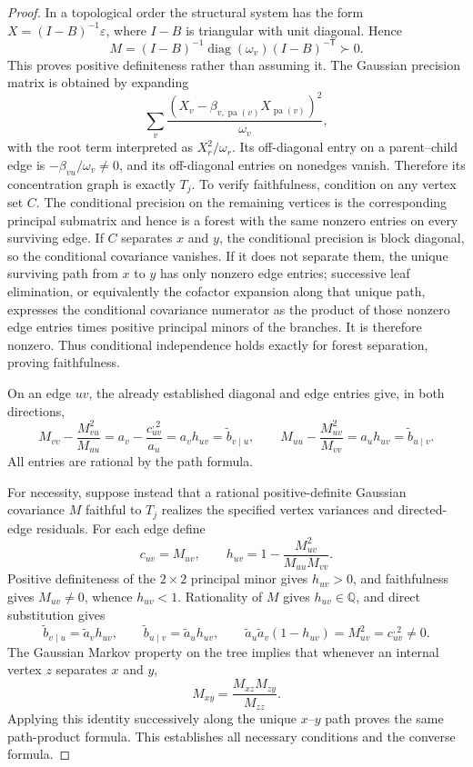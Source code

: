 \documentclass{article}
\begin{document}
\begin{proof}
In a topological order the structural system has the form \(X=(I-B)^{-1}\varepsilon\), where \(I-B\) is triangular with unit diagonal.  Hence
\[
 M=(I-B)^{-1}\operatorname{diag}(\omega_v)(I-B)^{-\mathsf T}\succ0.
\]
This proves positive definiteness rather than assuming it.  The Gaussian precision matrix is obtained by expanding
\[
 \sum_v\frac{(X_v-\beta_{v,\operatorname{pa}(v)}X_{\operatorname{pa}(v)})^2}{\omega_v},
\]
with the root term interpreted as \(X_r^2/\omega_r\).  Its off-diagonal entry on a parent--child edge is \(-\beta_{vu}/\omega_v\ne0\), and its off-diagonal entries on nonedges vanish.  Therefore its concentration graph is exactly \(T_j\).  To verify faithfulness, condition on any vertex set \(C\).  The conditional precision on the remaining vertices is the corresponding principal submatrix and hence is a forest with the same nonzero entries on every surviving edge.  If \(C\) separates \(x\) and \(y\), the conditional precision is block diagonal, so the conditional covariance vanishes.  If it does not separate them, the unique surviving path from \(x\) to \(y\) has only nonzero edge entries; successive leaf elimination, or equivalently the cofactor expansion along that unique path, expresses the conditional covariance numerator as the product of those nonzero edge entries times positive principal minors of the branches.  It is therefore nonzero.  Thus conditional independence holds exactly for forest separation, proving faithfulness.

On an edge \(uv\), the already established diagonal and edge entries give, in both directions,
\[
 M_{vv}-\frac{M_{vu}^{2}}{M_{uu}}
 =a_v-\frac{c_{uv}^{,2}}{a_u}
 =a_vh_{uv}=\widetilde b_{v\mid u},
\qquad
 M_{uu}-\frac{M_{uv}^{2}}{M_{vv}}
 =a_uh_{uv}=\widetilde b_{u\mid v}.
\]
All entries are rational by the path formula.

For necessity, suppose instead that a rational positive-definite Gaussian covariance \(M\) faithful to \(T_j\) realizes the specified vertex variances and directed-edge residuals.  For each edge define
\[
 c_{uv}=M_{uv},
 \qquad
 h_{uv}=1-\frac{M_{uv}^{2}}{M_{uu}M_{vv}}.
\]
Positive definiteness of the \(2\times2\) principal minor gives \(h_{uv}>0\), and faithfulness gives \(M_{uv}\ne0\), whence \(h_{uv}<1\).  Rationality of \(M\) gives \(h_{uv}\in\mathbb Q\), and direct substitution gives
\[
 \widetilde b_{v\mid u}=\widetilde a_vh_{uv},
 \qquad
 \widetilde b_{u\mid v}=\widetilde a_uh_{uv},
 \qquad
 \widetilde a_u\widetilde a_v(1-h_{uv})=M_{uv}^2=c_{uv}^{,2}\ne0.
\]
The Gaussian Markov property on the tree implies that whenever an internal vertex \(z\) separates \(x\) and \(y\),
\[
 M_{xy}=\frac{M_{xz}M_{zy}}{M_{zz}}.
\]
Applying this identity successively along the unique \(x\)--\(y\) path proves the same path-product formula.  This establishes all necessary conditions and the converse formula.


\end{proof}
\end{document}
